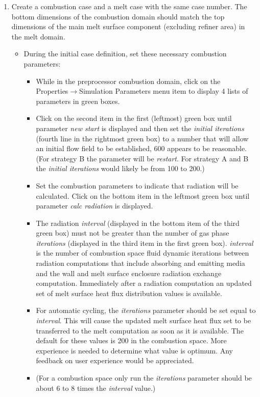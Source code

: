 \documentclass[12pt]{article}
\newcommand{\smenu}[2]{\textsf{#1$\to$#2}}
\newcommand{\parm}[1]{\textit{#1}}
\numberwithin{equation}{section}
\begin{document}
\noindent
\begin{enumerate}
	\item Create a combustion case and a melt case with the same case number. The bottom dimensions of the combustion domain should match the top dimensions of the main melt surface component (excluding refiner area) in the melt domain.
	\begin{itemize}
		\item During the initial case definition, set these necessary combustion parameters:
		\begin{itemize}
			\item While in the preprocessor combustion domain, click on the\\ \smenu{Properties}{Simulation Parameters} menu item to display 4 lists of parameters in green boxes.
			\item Click on the second item in the first (leftmost) green box until parameter \parm{new start} is displayed and then set the \parm{initial iterations} (fourth line in the rightmost green box) to a number that will allow an initial flow field to be established, 600 appears to be reasonable. (For strategy B the parameter will be \parm{restart}. For strategy A and B the \parm{initial iterations} would likely be from 100 to 200.)
			\item Set the combustion parameters to indicate that radiation will be calculated. Click on the bottom item in the leftmost green box until parameter \parm{calc radiation} is displayed. 
			\item The radiation \parm{interval} (displayed in the bottom item of the third green box) must not be greater than the number of gas phase \parm{iterations} (displayed in the third item in the first green box). \parm{interval} is the number of combustion space fluid dynamic iterations between radiation computations that include absorbing and emitting media and the wall and melt surface enclosure radiation exchange computation. Immediately after a radiation computation an updated set of melt surface heat flux distribution values is available.
			\item For automatic cycling, the \parm{iterations} parameter should be set equal to \parm{interval}. This will cause the updated melt surface heat flux set to be transferred to the melt computation as soon as it is available. The default for these values is 200 in the combustion space. More experience is needed to determine what value is optimum. Any feedback on user experience would be appreciated.
			\item (For a combustion space only run the \parm{iterations} parameter should be about 6 to 8 times the \parm{interval} value.)

\end{itemize}
\end{itemize}
\end{enumerate}
\end{document}
